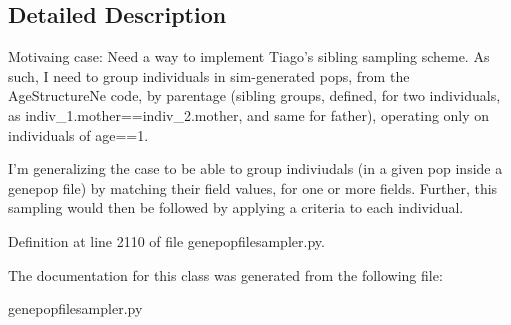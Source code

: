 \subsection{Detailed Description}
\begin{DoxyVerb}Motivaing case:  Need a way to implement Tiago's sibling sampling
scheme.  As such, I need to group individuals in sim-generated
pops, from the AgeStructureNe code, by parentage (sibling groups,
defined, for two individuals,  as indiv_1.mother==indiv_2.mother, 
and same for father), operating only on individuals of age==1.  

I'm generalizing the case to be able to group indiviudals (in a given
pop inside a genepop file) by matching their field values, for one or
more fields.  Further, this sampling would then be followed by applying
a criteria to each individual.
\end{DoxyVerb}
 

Definition at line 2110 of file genepopfilesampler.\+py.



The documentation for this class was generated from the following file\+:\begin{DoxyCompactItemize}
\item 
genepopfilesampler.\+py\end{DoxyCompactItemize}
